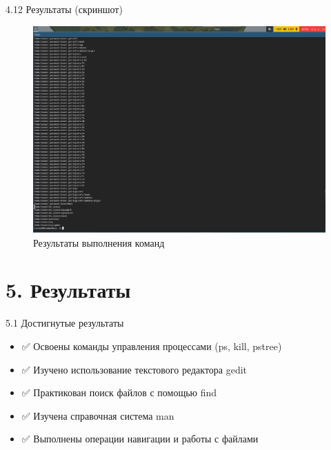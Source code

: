 \documentclass[
  ignorenonframetext,
  aspectratio=169,
  russian,
]{beamer}
\providecommand{\tightlist}{%
  \setlength{\itemsep}{0pt}\setlength{\parskip}{0pt}}
\begin{document}
\begin{frame}{4.12 Результаты (скриншот)}
\label{ux440ux435ux437ux443ux43bux44cux442ux430ux442ux44b-ux441ux43aux440ux438ux43dux448ux43eux442}
\begin{figure}[H]

{\centering \includegraphics[width=0.8\linewidth,height=\textheight,keepaspectratio]{image/result.png}

}

\caption{Результаты выполнения команд}

\end{figure}%
\end{frame}

\section{5. Результаты}\label{ux440ux435ux437ux443ux43bux44cux442ux430ux442ux44b}

\begin{frame}{5.1 Достигнутые результаты}
\label{ux434ux43eux441ux442ux438ux433ux43dux443ux442ux44bux435-ux440ux435ux437ux443ux43bux44cux442ux430ux442ux44b}
\begin{itemize}[<+->]
\tightlist
\item
  ✅ Освоены команды управления процессами (ps, kill, pstree)
\item
  ✅ Изучено использование текстового редактора gedit
\item
  ✅ Практикован поиск файлов с помощью find
\item
  ✅ Изучена справочная система man
\item
  ✅ Выполнены операции навигации и работы с файлами
\end{itemize}
\end{frame}
\end{document}
